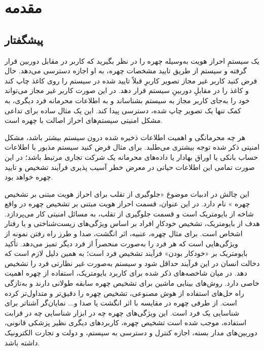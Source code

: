 
\chapter{مقدمه}
\thispagestyle{empty}
\section{پیشگفتار}
یک سیستمِ احراز هویت به‌وسیله چهره را در نظر بگیرید که کاربر در مقابل دوربین قرار گرفته و سیستم از طریق تایید مشخصات چهره، به او اجازه دسترسی می‌دهد. حال فرض کنید کاربر غیر مجاز تصویر کاربرِ قبلاً تایید شده در سیستم را روی کاغذ چاپ کند و کاغذ را در مقابلِ دوربینِ سیستم قرار دهد. در این صورت کاربر غیر مجاز می‌تواند خود را به‌جای کاربر مجاز به سیستم بشناساند و به اطلاعات محرمانه فرد دیگری، به کمک تنها یک تصویر چاپ شده، دسترسی پیدا کند. این یک مثال ساده برای تداعی مشکل امنیتی سیستم‌های احراز اصالت با چهره است.

هر چه محرمانگی و اهمیت اطلاعات ذخیره شده درون سیستم بیشتر باشد، مشکل امنیتی ذکر شده توجه بیشتری می‌طلبد. برای مثال فرض کنید سیستم مذبور با اطلاعات حساب بانکی یا اوراق بهادار یا داده‌های محرمانه یک شرکت تجاری مرتبط باشد؛ در این صورت تمامی این اطلاعات حیاتی در معرض خطر آسیب پذیری فرآیند تشخیص و تایید چهره خواهد بود.

این چالش در ادبیات موضوع «جلوگیری از تقلب برای احراز هویت مبتنی بر تشخیص چهره
» نام دارد. در این عنوان، قسمت احراز هویت مبتنی بر تشخیص چهره در واقع شاخه از بایومتریک
   است و قسمت جلوگیری از تقلب، به مسائل امنیتی کار می‌پردازد.
هدف از بایومتریک، تشخیص خودکارِ افراد بر اساس ویژگی‌های زیست‌شناختی و یا رفتار اشخاص است. برای مثال چهره، عنبیه، اثر انگشت، صدا و طرز راه رفتن نمونه از ویژگی‌هایی است که هر فرد را به‌صورت منحصراً از فرد دیگر تمیز می‌دهد.  تأکید بایومتریک بر «خودکار بودن» فرآیند تشخیص فرد است؛ به همین دلیل لازم است که دخالت انسان در این فرآیند حداقل شود و سیستم به‌صورت غیر نظارتی
 فرد را تشخیص دهد.
در میان شاخصه‌های ذکر شده برای کاربرد بایومتریک، استفاده از چهره اهمیت خاصی دارد. روش‌های بینایی ماشین برای تشخیص چهره سابقه طولانی دارند و به‌تازگی راه حل‌های استفاده از هوش مصنوعی، تشخیص چهره را دقیق‌تر و متداول‌تر کرده است. از طرفی چهره در مقایسه با اثر انگشت یا صدا و... نمایان‌گر آشناتر برای شناسایی یک فرد است. این ویژگی‌های چهره چه در ابزار شناسایی چه در قرابت استفاده، موجب شده است تشخیص چهره، کاربردهای دیگری نظیر پزشکی قانونی، دوربین‌های مدار بسته، اجازه کنترل و دسترسی به سیستم، و دولت و تجارت الکترونیک داشته باشد.


